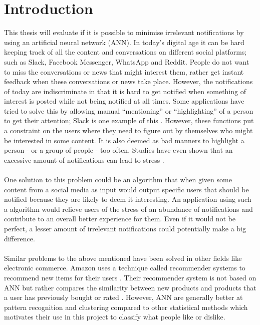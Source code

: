 \chapter{Introduction}

This thesis will evaluate if it is possible to minimise irrelevant notifications by using an artificial neural network (ANN). In today’s digital age it can be hard keeping track of all the content and conversations on different social platforms; such as Slack, Facebook Messenger, WhatsApp and Reddit. People do not want to miss the conversations or news that might interest them, rather get instant feedback when these conversations or news take place. However, the notifications of today are indiscriminate in that it is hard to get notified when something of interest is posted while not being notified at all times. Some applications have tried to solve this by allowing manual “mentioning” or “highlighting” of a person to get their attention; Slack is one example of this \parencite{slack}. However, these functions put a constraint on the users where they need to figure out by themselves who might be interested in some content. It is also deemed as bad manners to highlight a person - or a group of people - too often. Studies have even shown that an excessive amount of notifications can lead to stress \parencite{relaffinity}.
\\\\
One solution to this problem could be an algorithm that when given some content from a social media as input would output specific users that should be notified because they are likely to deem it interesting. An application using such a algorithm would relieve users of the stress of an abundance of notifications and contribute to an overall better experience for them. Even if it would not be perfect, a lesser amount of irrelevant notifications could potentially make a big difference.
\\\\
Similar problems to the above mentioned have been solved in other fields like electronic commerce. Amazon uses a technique called recommender systems to recommend new items for their users \parencite{amazonfiltering}. Their recommender system is not based on ANN but rather compares the similarity between new products and products that a user has previously bought or rated \parencite{amazonfiltering}. However, ANN are generally better at pattern recognition and clustering compared to other statistical methods \parencite{basheer2000artificial} which motivates their use in this project to classify what people like or dislike.


